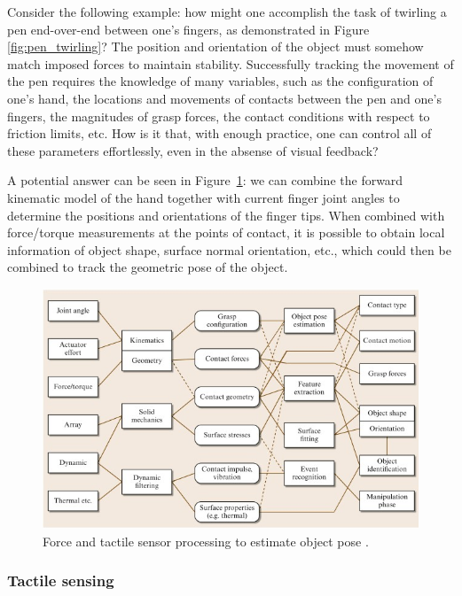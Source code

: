 Consider the following example: how might one accomplish the task of twirling a pen end-over-end between one's fingers, as demonstrated in Figure \ref{fig:pen_twirling}? 
The position and orientation of the object must somehow match imposed forces to maintain stability.
Successfully tracking the movement of the pen requires the knowledge of many variables, such as the configuration of one's hand, the locations and movements of contacts between the pen and one's fingers, the magnitudes of grasp forces, the contact conditions with respect to friction limits, etc.
How is it that, with enough practice, one can control all of these parameters effortlessly, even in the absense of visual feedback? 

A potential answer can be seen in Figure~\ref{fig:touch_id}: we can combine the forward kinematic model of the hand together with current finger joint angles to determine the positions and orientations of the finger tips.
When combined with force/torque measurements at the points of contact, it is possible to obtain local information of object shape, surface normal orientation, etc., which could then be combined to track the geometric pose of the object.

\begin{figure}[]
	\centering
	\includegraphics[width=\linewidth]{images/touch_id}
	\caption{Force and tactile sensor processing to estimate object pose \cite{cutkosky2008force}.}
	\label{fig:touch_id}
\end{figure}

\subsubsection*{Tactile sensing}

